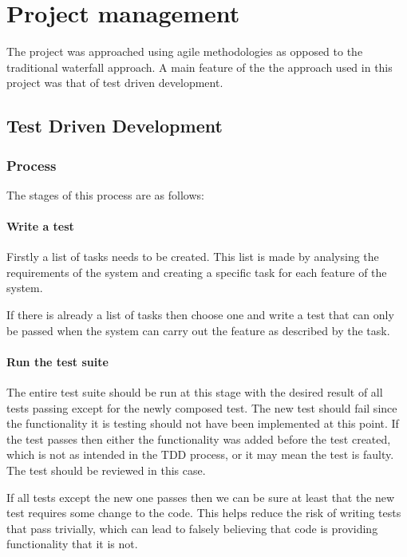 \chapter{Project management}
The project was approached using agile methodologies as opposed to the traditional waterfall approach. A main feature of the the approach used in this project was that of test driven development. 

\section{Test Driven Development}

\subsection{Process}

The stages of this process are as follows:
	
\subsubsection*{Write a test}

Firstly a list of tasks needs to be created. This list is made by analysing the requirements of the system and creating a specific task for each feature of the system. 

If there is already a list of tasks then choose one and write a test that can only be passed when the system can carry out the feature as described by the task.


\subsubsection*{Run the test suite}

The entire test suite should be run at this stage with the desired result of all tests passing except for the newly composed test. The new test should fail since the functionality it is testing should not have been implemented at this point. If the test passes then either the functionality was added before the test created, which is not as intended in the TDD process, or it may mean the test is faulty. The test should be reviewed in this case.

If all tests except the new one passes then we can be sure at least that the new test requires some change to the code. This helps reduce the risk of writing tests that pass trivially, which can lead to falsely believing that code is providing functionality that it is not.

